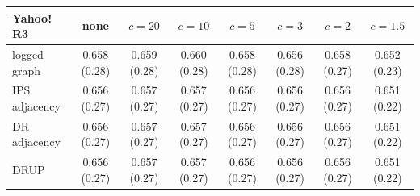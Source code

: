 \begin{tabular}{lccccccc}
\toprule
Yahoo!\,R3 & none & $c=20$ & $c=10$ & $c=5$ & $c=3$ & $c=2$ & $c=1.5$\\
\midrule
logged graph & 0.658 (0.28) & 0.659 (0.28) & 0.660 (0.28) & 0.658 (0.28) & 0.656 (0.28) & 0.658 (0.27) & 0.652 (0.23)\\
IPS adjacency & 0.656 (0.27) & 0.657 (0.27) & 0.657 (0.27) & 0.656 (0.27) & 0.656 (0.27) & 0.656 (0.27) & 0.651 (0.22)\\
DR adjacency & 0.656 (0.27) & 0.657 (0.27) & 0.657 (0.27) & 0.656 (0.27) & 0.656 (0.27) & 0.656 (0.27) & 0.651 (0.22)\\
DRUP & 0.656 (0.27) & 0.657 (0.27) & 0.657 (0.27) & 0.656 (0.27) & 0.656 (0.27) & 0.656 (0.27) & 0.651 (0.22)\\
\bottomrule
\end{tabular}

